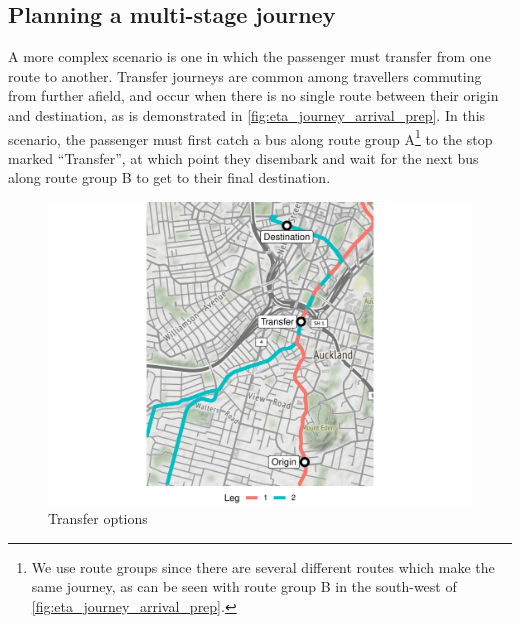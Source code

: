 \subsection{Planning a multi-stage journey}
\label{sec:journey_transfer}

A more complex scenario is one in which the passenger must transfer from one route to another. Transfer journeys are common among travellers commuting from further afield, and occur when there is no single route between their origin and destination, as is demonstrated in \cref{fig:eta_journey_arrival_prep}. In this scenario, the passenger must first catch a bus along route group A\footnote{We use route groups since there are several different routes which make the same journey, as can be seen with route group B in the south-west of \cref{fig:eta_journey_arrival_prep}.} to the stop marked ``Transfer'', at which point they disembark and wait for the next bus along route group B to get to their final destination.


\begin{knitrout}\small
{}\color{fgcolor}\begin{figure}

{\centering \includegraphics[width=\textwidth]{figure/eta_journey_transfer_prep-1} 

}

\caption[Transfer options]{Transfer options}\label{fig:eta_journey_transfer_prep}
\end{figure}


\end{knitrout}




